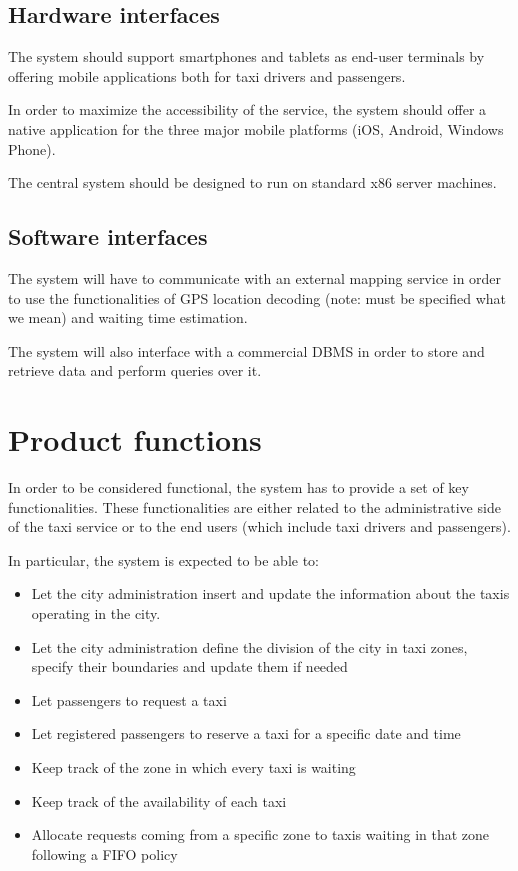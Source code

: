 \subsection{Hardware interfaces}
The system should support smartphones and tablets as end-user terminals by offering mobile applications both for taxi drivers and passengers.

In order to maximize the accessibility of the service, the system should offer a native application for the three major mobile platforms (iOS, Android, Windows Phone).

The central system should be designed to run on standard x86 server machines.


\subsection{Software interfaces}
The system will have to communicate with an external mapping service in order to use the functionalities of GPS location decoding (note: must be specified what we mean) and waiting time estimation.

The system will also interface with a commercial DBMS in order to store and retrieve data and perform queries over it.


\section{Product functions}
In order to be considered functional, the system has to provide a set of key functionalities.
These functionalities are either related to the administrative side of the taxi service or to the end users (which include taxi drivers and passengers).

In particular, the system is expected to be able to:
\begin{itemize}
\item Let the city administration insert and update the information about the taxis operating in the city.
\item Let the city administration define the division of the city in taxi zones, specify their boundaries and update them if needed
\item Let passengers to request a taxi
\item Let registered passengers to reserve a taxi for a specific date and time
\item Keep track of the zone in which every taxi is waiting
\item Keep track of the availability of each taxi
\item Allocate requests coming from a specific zone to taxis waiting in that zone following a FIFO policy
\end{itemize}


